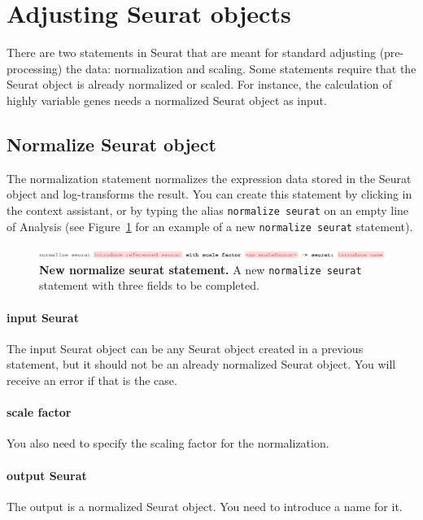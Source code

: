 \section{Adjusting Seurat objects}
There are two statements in Seurat that are meant for standard adjusting
(pre-processing) the data: normalization and scaling. Some statements require that the
Seurat object is already normalized or scaled. For instance, the calculation of highly
variable genes needs a normalized Seurat object as input.

\subsection{Normalize Seurat object}
The normalization statement normalizes the expression data stored in the Seurat object and
log-transforms the result. You can create this statement by clicking
 in the context assistant, or by typing
the alias \texttt{normalize seurat} on an empty line of Analysis (see Figure~\ref{fig:NormalizeSeurat}
for an example of a new \texttt{normalize seurat} statement).

\begin{figure}[h!tbp]
  \centering
  \includegraphics[width=\figWidthWide]{figures/NormalizeSeurat.pdf}
    \caption[New normalize seurat statement.]{\textbf{New normalize seurat statement.}
    A new \texttt{normalize seurat} statement with three fields to be completed.}
\label{fig:NormalizeSeurat}
\end{figure}

\paragraph{input Seurat}
The input Seurat object can be any Seurat object created in a previous statement, but it
should not be an already normalized Seurat object. You will receive an error if that is the
case.

\paragraph{scale factor}
You also need to specify the scaling factor for the normalization.

\paragraph{output Seurat}
The output is a normalized Seurat object. You need to introduce a name for
it.

